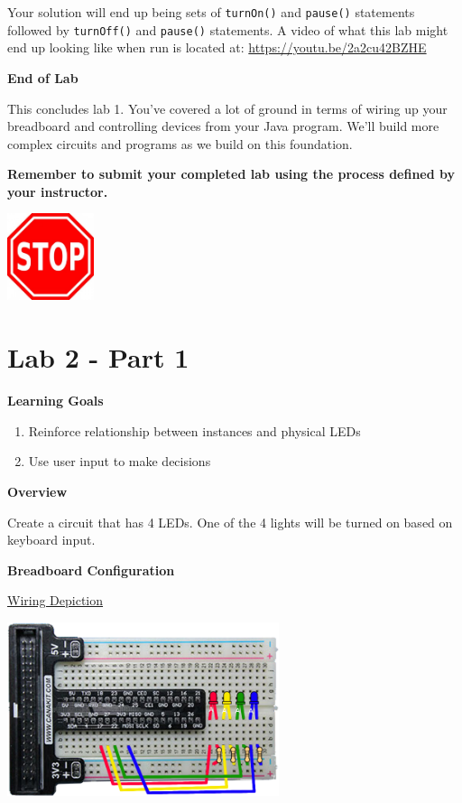 Your solution will end up being sets of \texttt{turnOn()} and \texttt{pause()} statements followed by \texttt{turnOff()} and \texttt{pause()} statements. A video of what this lab might end up looking like when run is located at: \url{https://youtu.be/2a2cu42BZHE}

\textbf{End of Lab}

This concludes lab 1. You've covered a lot of ground in terms of wiring up your breadboard and controlling devices from your Java program. We'll build more complex circuits and programs as we build on this foundation.

\textbf{Remember to submit your completed lab using the process defined by your instructor.}

{\centering
\beforefig
\centerline{\includegraphics[height=1in]{pi_images/stop_sign_clip_art_16252.jpg}}
\afterfig
}

\newpage

\section{Lab 2 - Part 1}

\textbf{Learning Goals}

\begin{enumerate}
	\item Reinforce relationship between instances and physical LEDs
	\item Use user input to make decisions
\end{enumerate}

\textbf{Overview}

Create a circuit that has 4 LEDs. One of the 4 lights will be turned on based on keyboard input.

\textbf{Breadboard Configuration}

\underline{Wiring Depiction}

\beforefig
\centerline{\includegraphics[height=2in]{pi_images/lab02images/PiLab02-4Light.png}}
\afterfig

